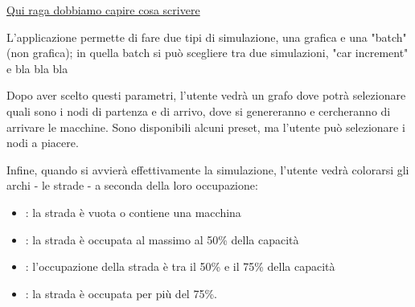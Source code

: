 \documentclass[main.tex]{subfiles}
\begin{document}
{\color{red} \underline{Qui raga dobbiamo capire cosa scrivere}

L'applicazione permette di fare due tipi di simulazione, una grafica e una "batch" (non grafica); in quella batch si può scegliere tra due simulazioni, "car increment" e bla bla bla




Dopo aver scelto questi parametri, l'utente vedrà un grafo dove potrà selezionare quali sono i nodi di partenza e di arrivo, dove si genereranno e cercheranno di arrivare le macchine. Sono disponibili alcuni preset, ma l'utente può selezionare i nodi a piacere. 

Infine, quando si avvierà effettivamente la simulazione, l'utente vedrà colorarsi gli archi - le strade - a seconda della loro occupazione:
\begin{itemize}
    \item {}: la strada è vuota o contiene una macchina
    \item {}: la strada è occupata al massimo al 50\% della capacità
    \item {}: l'occupazione della strada è tra il 50\% e il 75\% della capacità 
    \item {}: la strada è occupata per più del 75\%.
\end{itemize}

}
\end{document}
